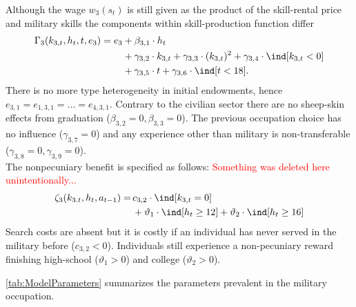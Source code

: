 Although the wage $w_{3}(s_t)$ is still given as the product of the skill-rental price and military skills the components within skill-production function differ
%
\begin{align}
    \Gamma_3( k_{3,t}, h_t, t, e_3) = e_3 & + \beta_{3,1} \cdot h_t \nonumber \\
	               \nonumber &+ \gamma_{3,2} \cdot  k_{3,t} + \gamma_{3,3} \cdot (k_{3,t})^2 + \gamma_{3,4} \cdot \ind[k_{3,t} < 0] \\
									 & + \gamma_{3,5} \cdot t + \gamma_{3,6} \cdot \ind[t < 18].
\end{align}
%
There is no more type heterogeneity in initial endowments, hence $e_{3,1} = e_{1,3,1} = \dots = e_{4,3,1}$. Contrary to the civilian sector there are no sheep-skin effects from graduation ($\beta_{3,2} = 0, \beta_{3,3}= 0$). The previous occupation choice has no influence ($\gamma_{3,7}= 0$) and any experience other than military is non-transferable ($\gamma_{3,8} = 0, \gamma_{3,9} = 0$). \\

The nonpecuniary benefit is specified as follows: \textcolor{red}{Something was deleted here unintentionally...}
%
\begin{align*}
\zeta_{3}( k_{3.t}, h_t, a_{t-1} )  = \,& c_{3,2} \cdot \ind[k_{3,t} = 0] \nonumber \\
  & + \vartheta_1 \cdot \ind[h_t \geq 12] + \vartheta_2 \cdot \ind[h_t \geq 16]
\end{align*}
Search costs are absent but it is costly if an individual has never served in the military before ($c_{3,2} < 0$). Individuals still experience a non-pecuniary reward finishing high-school ($\vartheta_1 >0$) and college ($\vartheta_2 > 0$). 

\autoref{tab:ModelParameters} summarizes the parameters prevalent in the military occupation.


